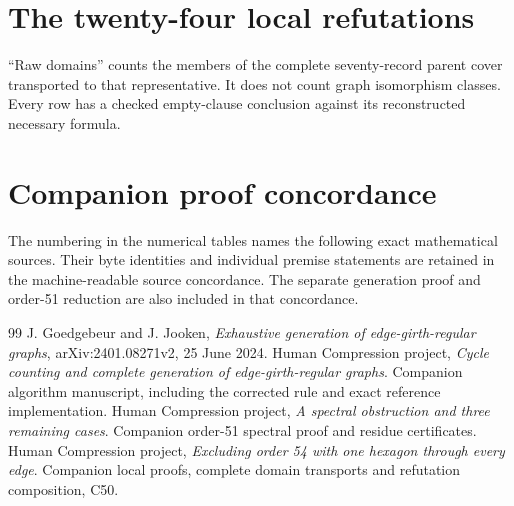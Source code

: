 \documentclass[11pt,a4paper]{article}
\begin{document}
\section{The twenty-four local refutations}\label{app:hosts}
``Raw domains'' counts the members of the complete seventy-record
parent cover transported to that representative. It does not count
graph isomorphism classes. Every row has a checked empty-clause
conclusion against its reconstructed necessary formula.
{\small}

\section{Companion proof concordance}\label{app:components}
The numbering in the numerical tables names the following exact
mathematical sources. Their byte identities and individual premise
statements are retained in the machine-readable source concordance.
The separate generation proof and order-51 reduction are also included
in that concordance.


\begin{thebibliography}{99}
 J. Goedgebeur and J. Jooken,
\emph{Exhaustive generation of edge-girth-regular graphs},
arXiv:2401.08271v2, 25 June 2024.
 Human Compression project,
\emph{Cycle counting and complete generation of edge-girth-regular graphs}.
Companion algorithm manuscript, including the corrected rule and exact
reference implementation.
 Human Compression project,
\emph{A spectral obstruction and three remaining cases}. Companion order-51 spectral proof
and residue certificates.
 Human Compression project,
\emph{Excluding order 54 with one hexagon through every edge}.
Companion local proofs, complete domain transports and refutation
composition, C50.

\end{thebibliography}
\end{document}
